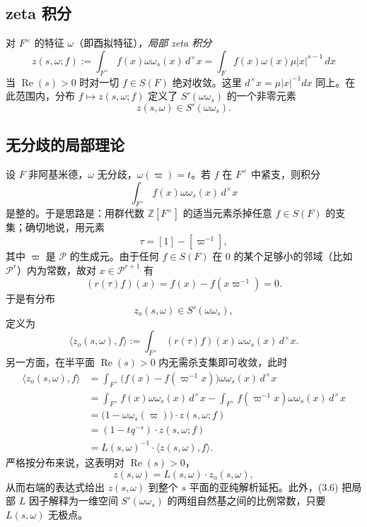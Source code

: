 \subsection*{zeta 积分}

对 $F^\times$ 的特征 $\omega$（即酉拟特征），\emph{局部 zeta 积分}
\begin{equation*}\tag{3.3}
z(s,\omega;f):=\int_{F^\times}f(x)\omega\omega_s(x)\,d^\times x
=\int_F f(x)\omega(x)\mu|x|^{s-1}\,dx
\end{equation*}
当 $\operatorname{Re}(s)>0$ 时对一切 $f\in S(F)$ 绝对收敛。这里 $d^\times x=\mu|x|^{-1}dx$ 同上。在此范围内，分布 $f\mapsto z(s,\omega;f)$ 定义了 $S'(\omega\omega_s)$ 的一个非零元素
\[
z(s,\omega)\in S'(\omega\omega_s).
\]

\subsection*{无分歧的局部理论}

设 $F$ 非阿基米德，$\omega$ 无分歧，$\omega(\varpi)=t$。若 $f$ 在 $F^\times$ 中紧支，则积分
\[
\int_{F^\times}f(x)\omega\omega_s(x)\,d^\times x
\]
是整的。于是思路是：用群代数 $\mathbb Z[F^\times]$ 的适当元素杀掉任意 $f\in S(F)$ 的支集；确切地说，用元素
\begin{equation*}\tag{3.4}
\tau=[1]-[\varpi^{-1}],
\end{equation*}
其中 $\varpi$ 是 $\mathcal P$ 的生成元。由于任何 $f\in S(F)$ 在 $0$ 的某个足够小的邻域（比如 $\mathcal P^r$）内为常数，故对 $x\in\mathcal P^{r+1}$ 有
\[
(r(\tau)f)(x)=f(x)-f(x\varpi^{-1})=0.
\]
于是有分布
\[
z_o(s,\omega)\in S'(\omega\omega_s),
\]
定义为
\begin{equation*}\tag{3.5}
\langle z_o(s,\omega),f\rangle:=\int_{F^\times}(r(\tau)f)(x)\,\omega\omega_s(x)\,d^\times x.
\end{equation*}
另一方面，在半平面 $\operatorname{Re}(s)>0$ 内无需杀支集即可收敛，此时
\[
\begin{aligned}
\langle z_o(s,\omega),f\rangle
&=\int_{F^\times}\bigl(f(x)-f(\varpi^{-1}x)\bigr)\omega\omega_s(x)\,d^\times x\\
&=\int_{F^\times}f(x)\omega\omega_s(x)\,d^\times x-\int_{F^\times}f(\varpi^{-1}x)\omega\omega_s(x)\,d^\times x\\
&=\bigl(1-\omega\omega_s(\varpi)\bigr)\cdot z(s,\omega;f)\\
&=(1-tq^{-s})\cdot z(s,\omega;f)\\
&=L(s,\omega)^{-1}\cdot\langle z(s,\omega),f\rangle.
\end{aligned}
\]
严格按分布来说，这表明对 $\operatorname{Re}(s)>0$，
\begin{equation*}\tag{3.6}
z(s,\omega)=L(s,\omega)\cdot z_o(s,\omega),
\end{equation*}
从而右端的表达式给出 $z(s,\omega)$ 到整个 $s$ 平面的亚纯解析延拓。此外，(3.6) 把局部 $L$ 因子解释为一维空间 $S'(\omega\omega_s)$ 的两组自然基之间的比例常数，只要 $L(s,\omega)$ 无极点。

